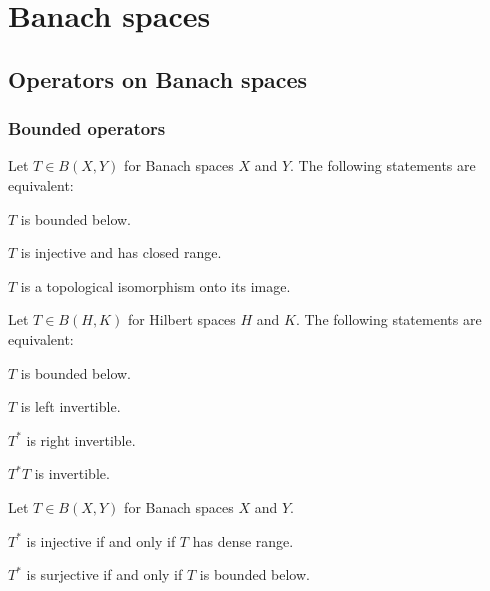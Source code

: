 \documentclass{../../large}
\begin{document}
\begin{prb}

\end{prb}



















\part{Banach spaces}




\chapter{Operators on Banach spaces}

\section{Bounded operators}
\begin{prb}
Let $T\in B(X,Y)$ for Banach spaces $X$ and $Y$.
The following statements are equivalent:
\begin{parts}
\item $T$ is bounded below.
\item $T$ is injective and has closed range.
\item $T$ is a topological isomorphism onto its image.
\end{parts}
\end{prb}

\begin{prb}
Let $T\in B(H,K)$ for Hilbert spaces $H$ and $K$.
The following statements are equivalent:
\begin{parts}
\item $T$ is bounded below.
\item $T$ is left invertible.
\item $T^*$ is right invertible.
\item $T^*T$ is invertible.
\end{parts}
\end{prb}

\begin{prb}
Let $T\in B(X,Y)$ for Banach spaces $X$ and $Y$.
\begin{parts}
\item $T^*$ is injective if and only if $T$ has dense range.
\item $T^*$ is surjective if and only if $T$ is bounded below.
\end{parts}
\end{prb}
\end{document}
